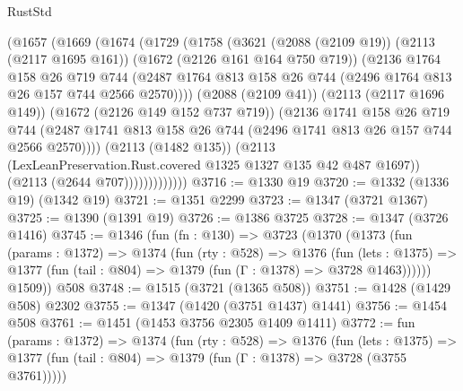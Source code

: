 \begin{lexlean}{RustStd}
\begin{coremodule}
                  (@1657
                    (@1669
                      (@1674
                        (@1729
                          (@1758
                            (@3621
                              (@2088 (@2109 @19))
                              (@2113 (@2117 @1695 @161))
                              (@1672 (@2126 @161 @164 @750 @719))
                              (@2136
                                @1764
                                @158
                                @26
                                @719
                                @744
                                (@2487
                                  @1764
                                  @813
                                  @158
                                  @26
                                  @744
                                  (@2496 @1764 @813 @26 @157 @744 @2566 @2570))))
                            (@2088 (@2109 @41))
                            (@2113 (@2117 @1696 @149))
                            (@1672 (@2126 @149 @152 @737 @719))
                            (@2136
                              @1741
                              @158
                              @26
                              @719
                              @744
                              (@2487
                                @1741
                                @813
                                @158
                                @26
                                @744
                                (@2496 @1741 @813 @26 @157 @744 @2566 @2570))))
                          (@2113 (@1482 @135))
                          (@2113 (LexLeanPreservation.Rust.covered @1325 @1327 @135 @42 @487 @1697))
                          (@2113 (@2644 @707)))))))))))))
@3716 := @1330 @19
@3720 := @1332 (@1336 @19) (@1342 @19)
@3721 := @1351 @2299
@3723 := @1347 (@3721 @1367)
@3725 := @1390 (@1391 @19)
@3726 := @1386 @3725
@3728 := @1347 (@3726 @1416)
@3745 := @1346
    (fun (fn : @130) =>
    @3723
      (@1370
        (@1373
          (fun (params : @1372) =>
          @1374
            (fun (rty : @528) =>
            @1376
              (fun (lets : @1375) =>
              @1377 (fun (tail : @804) => @1379 (fun (Γ : @1378) => @3728 @1463))))))
        @1509))
    @508
@3748 := @1515 (@3721 (@1365 @508))
@3751 := @1428 (@1429 @508) @2302
@3755 := @1347 (@1420 (@3751 @1437) @1441)
@3756 := @1454 @508
@3761 := @1451 (@1453 @3756 @2305 @1409 @1411)
@3772 := fun (params : @1372) =>
  @1374
    (fun (rty : @528) =>
    @1376
      (fun (lets : @1375) =>
      @1377 (fun (tail : @804) => @1379 (fun (Γ : @1378) => @3728 (@3755 @3761)))))

\end{coremodule}
\end{lexlean}
